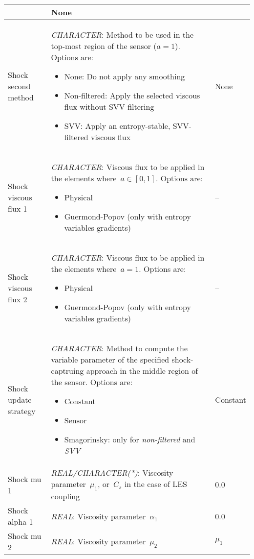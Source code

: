 \documentclass[a4paper,10pt]{report}
\begin{document}
\begin{longtable}{|l|p{10cm}|p{2.2cm}|}
\begin{itemize}
    \end{itemize} & None \\ \hline
Shock second method &\textit{CHARACTER}: Method to be used in the top-most region of the sensor ($a=1$). Options are:
    \begin{itemize}
        \item None: Do not apply any smoothing
        \item Non-filtered: Apply the selected viscous flux without SVV filtering
        \item SVV: Apply an entropy-stable, SVV-filtered viscous flux
    \end{itemize} & None \\ \hline
Shock viscous flux 1 & \textit{CHARACTER}: Viscous flux to be applied in the elements where~$a\in[0,1]$. Options are:
    \begin{itemize}
        \item Physical
        \item Guermond-Popov (only with entropy variables gradients)
    \end{itemize} & -- \\ \hline
Shock viscous flux 2 & \textit{CHARACTER}: Viscous flux to be applied in the elements where~$a=1$. Options are:
    \begin{itemize}
        \item Physical
        \item Guermond-Popov (only with entropy variables gradients)
    \end{itemize} & -- \\ \hline
Shock update strategy & \textit{CHARACTER}: Method to compute the variable parameter of the specified shock-captruing approach in the middle region of the sensor. Options are:
    \begin{itemize}
        \item Constant
        \item Sensor
        \item Smagorinsky: only for \textit{non-filtered} and \textit{SVV}
    \end{itemize} & Constant \\ \hline
Shock mu 1 & \textit{REAL/CHARACTER(*)}: Viscosity parameter~$\mu_1$, or~$C_s$ in the case of LES coupling & 0.0 \\ \hline
Shock alpha 1 & \textit{REAL}: Viscosity parameter~$\alpha_1$ & 0.0 \\ \hline
Shock mu 2 & \textit{REAL}: Viscosity parameter~$\mu_2$ & $\mu_1$ \\ \hline

\end{longtable}
\end{document}
